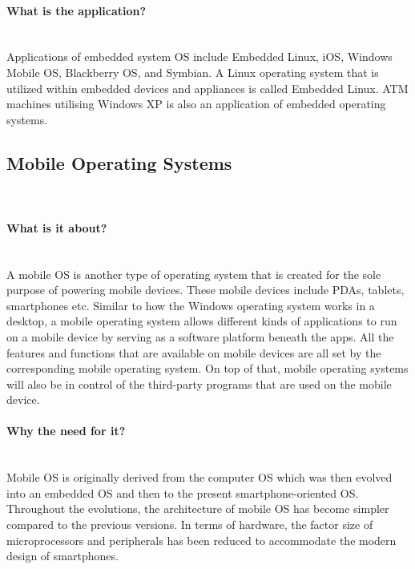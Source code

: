 \documentclass[conference]{IEEEtran}
\newcommand{\forceindent}{\leavevmode{\parindent=1em\indent}}
\begin{document}
\medskip
\paragraph{What is the application?}\mbox{} \\
\forceindent Applications of embedded system OS include Embedded Linux, iOS, Windows Mobile OS, Blackberry OS, and Symbian. A Linux operating system that is utilized within embedded devices and appliances is called Embedded Linux. ATM machines utilising Windows XP is also an application of embedded operating systems.

\subsection{Mobile Operating Systems}\\
\paragraph{What is it about?}\mbox{} \\
\forceindent A mobile OS is another type of operating system that is created for the sole purpose of powering mobile devices. These mobile devices include PDAs, tablets, smartphones etc. Similar to how the Windows operating system works in a desktop, a mobile operating system allows different kinds of applications to run on a mobile device by serving as a software platform beneath the apps. All the features and functions that are available on mobile devices are all set by the corresponding mobile operating system. On top of that, mobile operating systems will also be in control of the third-party programs that are used on the mobile device\cite{CSMOS}.
\medskip
\\
\paragraph{Why the need for it?}\mbox{} \\
\forceindent Mobile OS is originally derived from the computer OS which was then evolved into an embedded OS and then to the present smartphone-oriented OS. Throughout the evolutions, the architecture of mobile OS has become simpler compared to the previous versions. In terms of hardware, the factor size of microprocessors and peripherals has been reduced to accommodate the modern design of smartphones.
\end{document}
